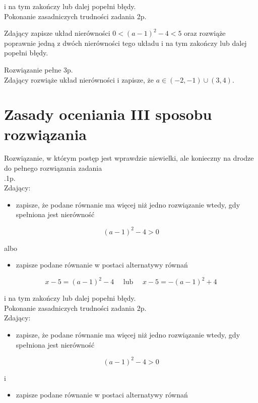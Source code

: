 \documentclass[10pt]{article}
\begin{document}
i na tym zakończy lub dalej popełni błędy.\\
Pokonanie zasadniczych trudności zadania 2p.

Zdający zapisze układ nierówności $0<(a-1)^{2}-4<5$ oraz rozwiąże poprawnie jedną z dwóch nierówności tego układu i na tym zakończy lub dalej popełni błędy.

Rozwiązanie pełne 3p.\\
Zdający rozwiąże układ nierówności i zapisze, że $a \in(-2,-1) \cup(3,4)$.

\section*{Zasady oceniania III sposobu rozwiązania}
Rozwiązanie, w którym postęp jest wprawdzie niewielki, ale konieczny na drodze do pełnego rozwiązania zadania\\
.1p.\\
Zdający:

\begin{itemize}
  \item zapisze, że podane równanie ma więcej niż jedno rozwiązanie wtedy, gdy spełniona jest nierówność
\end{itemize}

$$
(a-1)^{2}-4>0
$$

albo

\begin{itemize}
  \item zapisze podane równanie w postaci alternatywy równań
\end{itemize}

$$
x-5=(a-1)^{2}-4 \quad \text { lub } \quad x-5=-(a-1)^{2}+4
$$

i na tym zakończy lub dalej popełni błędy.\\
Pokonanie zasadniczych trudności zadania 2p.\\
Zdający:

\begin{itemize}
  \item zapisze, że podane równanie ma więcej niż jedno rozwiązanie wtedy, gdy spełniona jest nierówność
\end{itemize}

$$
(a-1)^{2}-4>0
$$

i

\begin{itemize}
  \item zapisze podane równanie w postaci alternatywy równań
\end{itemize}
\end{document}
